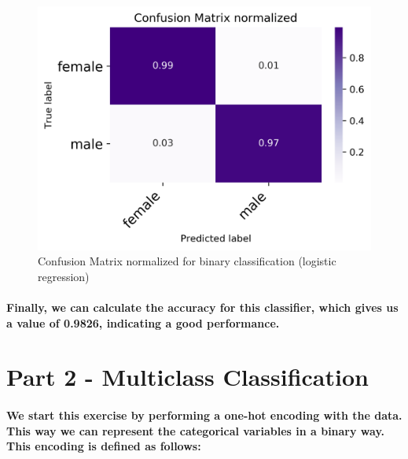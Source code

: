 \documentclass[a4paper]{article}    %
\begin{document}
\begin{figure}[H]
    \centering
    \includegraphics[width=12cm]{binary_cm_norm}
    \caption{Confusion Matrix normalized for binary classification (logistic regression)}
    \label{fig:ex1-cm_norm}
\end{figure}

\paragraph{Finally, we can calculate the accuracy for this classifier, which gives us a value of 0.9826, indicating a good performance.}

\section{Part 2 - Multiclass Classification}

\paragraph{We start this exercise by performing a one-hot encoding with the data. This way we can represent the categorical variables in a binary way. This encoding is defined as follows:}
\end{document}
